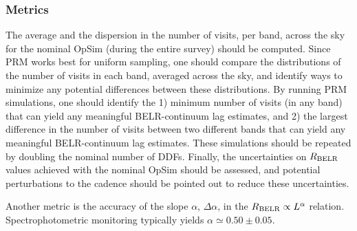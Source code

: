 \subsubsection{Metrics}
\label{sec:\secname:metrics}

The average and the dispersion in the number of visits, per band, across
the sky for the nominal OpSim (during the entire survey) should be computed.
Since PRM works best for uniform sampling, one should compare the distributions
of the number of visits in each band, averaged across the sky, and identify
ways to minimize any potential differences between these distributions. By
running PRM simulations, one should identify the 1) minimum number of visits
(in any band) that can yield any meaningful BELR-continuum lag estimates, and
2) the largest difference in the number of visits between two different bands
that can yield any meaningful BELR-continuum lag estimates. These simulations
should be repeated by doubling the nominal number of DDFs. Finally, the
uncertainties on $R_{\rm BELR}$ values achieved with the nominal OpSim
should be assessed, and potential perturbations to the cadence should be
pointed out to reduce these uncertainties.

Another metric is the accuracy of the slope $\alpha$, $\Delta \alpha$, in the
$R_{\rm BELR} \propto L^{\alpha}$ relation. Spectrophotometric monitoring
typically yields $\alpha \simeq 0.50 \pm 0.05$.

%
%
%
%
%
%
%
%

\navigationbar
